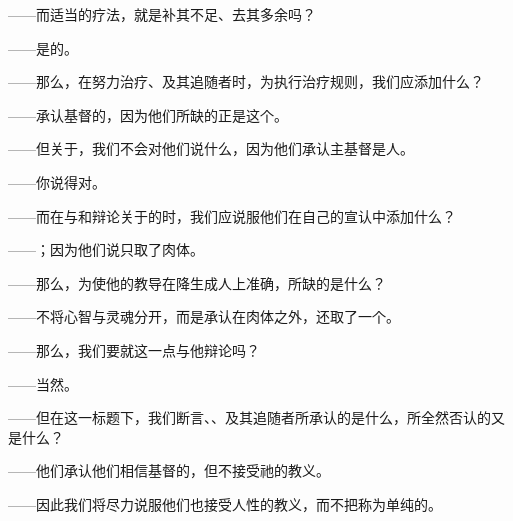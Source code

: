 ——而适当的疗法，就是补其不足、去其多余吗？\par

——是的。\par

——那么，在努力治疗、及其追随者时，为执行治疗规则，我们应添加什么？\par

——承认基督的，因为他们所缺的正是这个。\par

——但关于，我们不会对他们说什么，因为他们承认主基督是人。\par

——你说得对。\par

——而在与和辩论关于的时，我们应说服他们在自己的宣认中添加什么？\par

——；因为他们说只取了肉体。\par

——那么，为使他的教导在降生成人上准确，所缺的是什么？\par

——不将心智与灵魂分开，而是承认在肉体之外，还取了一个。\par

——那么，我们要就这一点与他辩论吗？\par

——当然。\par

——但在这一标题下，我们断言、、及其追随者所承认的是什么，所全然否认的又是什么？\par

——他们承认他们相信基督的，但不接受祂的教义。\par

——因此我们将尽力说服他们也接受人性的教义，而不把称为单纯的。\par

